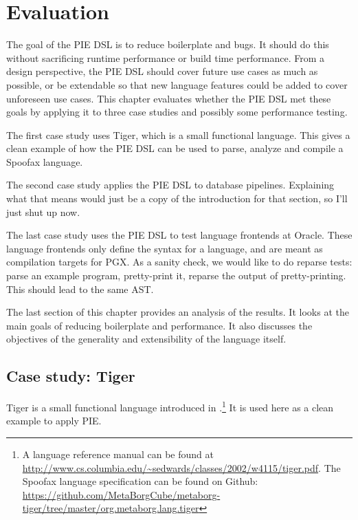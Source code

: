 \chapter{Evaluation}
\label{chap:evaluation}

The goal of the \ac{PIE} \ac{DSL} is to reduce boilerplate and bugs.
It should do this without sacrificing runtime performance or build time performance.
From a design perspective, the \ac{PIE} \ac{DSL} should cover future use cases as much as possible, or be extendable so that new language features could be added to cover unforeseen use cases.
This chapter evaluates whether the \ac{PIE} \ac{DSL} met these goals by applying it to three case studies and possibly some performance testing.

The first case study uses Tiger, which is a small functional language.
This gives a clean example of how the PIE DSL can be used to parse, analyze and compile a Spoofax language.

The second case study applies the \ac{PIE} \ac{DSL} to database pipelines.
Explaining what that means would just be a copy of the introduction for that section, so I'll just shut up now.

The last case study uses the \ac{PIE} \ac{DSL} to test language frontends at Oracle.
These language frontends only define the syntax for a language, and are meant as compilation targets for PGX.
As a sanity check, we would like to do reparse tests: parse an example program, pretty-print it, reparse the output of pretty-printing.
This should lead to the same AST.

The last section of this chapter provides an analysis of the results.
It looks at the main goals of reducing boilerplate and performance.
It also discusses the objectives of the generality and extensibility of the language itself.


\section{Case study: Tiger}
\label{sec:evaluation__tiger}

Tiger is a small functional language introduced in \textcite{Appel1998}.\footnote{A language reference manual can be found at \url{http://www.cs.columbia.edu/~sedwards/classes/2002/w4115/tiger.pdf}. The Spoofax language specification can be found on Github: \url{https://github.com/MetaBorgCube/metaborg-tiger/tree/master/org.metaborg.lang.tiger}}
It is used here as a clean example to apply \ac{PIE}.

